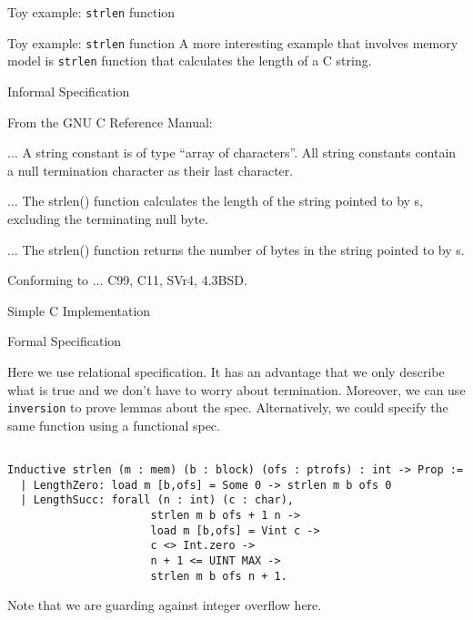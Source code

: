 \documentclass{beamer}
\begin{document}
           

  \begin{frame}
  \begin{center}
    \huge Toy example: \texttt{strlen} function
  \end{center}
  \end{frame}

  \begin{frame}{Toy example: \texttt{strlen} function}
    A more interesting example that involves memory model is \texttt{strlen} function that calculates the length of a C string.
    \end{frame}

\begin{frame}{Informal Specification}


  From the GNU C Reference Manual:
 \bigskip


  $\ldots$ A string constant is of type ``array of characters''. All string constants contain a null termination character as their last character.

\bigskip

$\ldots$ The strlen() function calculates the length of the string pointed to
 by s, excluding the terminating null byte.

 \bigskip

 
$\ldots$ 
 The strlen() function returns the number of bytes in the string
 pointed to by s.

 \bigskip

Conforming to $\ldots$ C99, C11, SVr4, 4.3BSD.



\end{frame}

\begin{frame}{Simple C Implementation}



\end{frame}

\begin{frame}[t,fragile]{Formal Specification}

Here we use relational specification. It has an advantage that we only describe what is true and we don't have to worry about termination. Moreover, we can use \texttt{inversion} to prove lemmas about the spec. Alternatively, we could specify the same function using a functional spec. 
  \begin{lstlisting}[language=Coq]
    
Inductive strlen (m : mem) (b : block) (ofs : ptrofs) : int -> Prop :=
  | LengthZero: load m [b,ofs] = Some 0 -> strlen m b ofs 0
  | LengthSucc: forall (n : int) (c : char),
                      strlen m b ofs + 1 n ->
                      load m [b,ofs] = Vint c ->
                      c <> Int.zero ->
                      n + 1 <= UINT MAX ->
                      strlen m b ofs n + 1.
                    \end{lstlisting}
                    
Note that we are guarding against integer overflow here.  
  
\end{frame}
\end{document}
